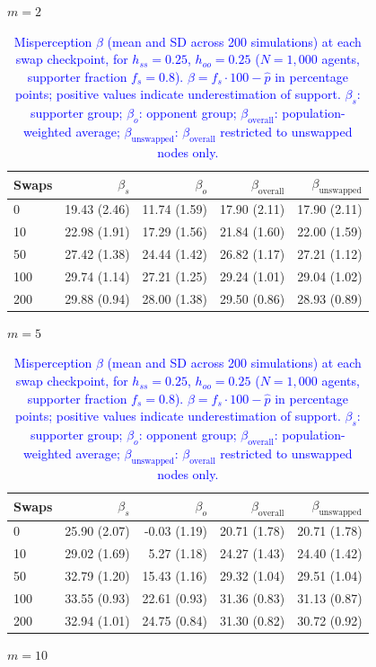 \begin{table}[H]
\centering
\caption{\textcolor{blue}{Misperception $\beta$ (mean and SD across 200 simulations) at each swap checkpoint, for $h_{ss} = 0.25$, $h_{oo} = 0.25$ ($N = 1{,}000$ agents, supporter fraction $f_s = 0.8$). $\beta = f_s \cdot 100 - \hat{p}$ in percentage points; positive values indicate underestimation of support. $\beta_s$: supporter group; $\beta_o$: opponent group; $\beta_{\mathrm{overall}}$: population-weighted average; $\beta_{\mathrm{unswapped}}$: $\beta_{\mathrm{overall}}$ restricted to unswapped nodes only.}}
\label{tab:subset_fs08_hss250_hoo250}
\par\medskip
\noindent\textit{$m = 2$}\\[2pt]
\begin{tabular}{l rrrr}
\toprule
Swaps & $\beta_s$ & $\beta_o$ & $\beta_{\mathrm{overall}}$ & $\beta_{\mathrm{unswapped}}$ \\
\midrule
0 & 19.43 (2.46) & 11.74 (1.59) & 17.90 (2.11) & 17.90 (2.11) \\
10 & 22.98 (1.91) & 17.29 (1.56) & 21.84 (1.60) & 22.00 (1.59) \\
50 & 27.42 (1.38) & 24.44 (1.42) & 26.82 (1.17) & 27.21 (1.12) \\
100 & 29.74 (1.14) & 27.21 (1.25) & 29.24 (1.01) & 29.04 (1.02) \\
200 & 29.88 (0.94) & 28.00 (1.38) & 29.50 (0.86) & 28.93 (0.89) \\
\bottomrule
\end{tabular}
\par\medskip
\noindent\textit{$m = 5$}\\[2pt]
\begin{tabular}{l rrrr}
\toprule
Swaps & $\beta_s$ & $\beta_o$ & $\beta_{\mathrm{overall}}$ & $\beta_{\mathrm{unswapped}}$ \\
\midrule
0 & 25.90 (2.07) & -0.03 (1.19) & 20.71 (1.78) & 20.71 (1.78) \\
10 & 29.02 (1.69) & 5.27 (1.18) & 24.27 (1.43) & 24.40 (1.42) \\
50 & 32.79 (1.20) & 15.43 (1.16) & 29.32 (1.04) & 29.51 (1.04) \\
100 & 33.55 (0.93) & 22.61 (0.93) & 31.36 (0.83) & 31.13 (0.87) \\
200 & 32.94 (1.01) & 24.75 (0.84) & 31.30 (0.82) & 30.72 (0.92) \\
\bottomrule
\end{tabular}
\par\medskip
\noindent\textit{$m = 10$}\\[2pt]

\end{table}
